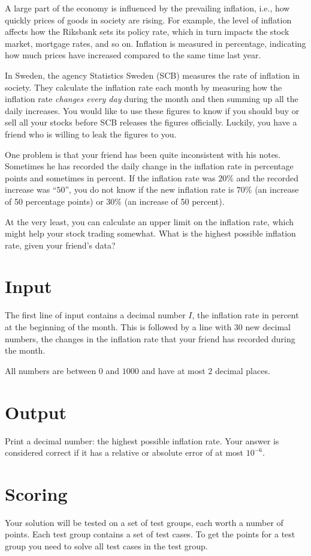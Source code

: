 A large part of the economy is influenced by the prevailing inflation, i.e., how quickly prices of
goods in society are rising. For example, the level of inflation affects how the Riksbank sets its
policy rate, which in turn impacts the stock market, mortgage rates, and so on.
Inflation is measured in percentage, indicating how much prices have increased compared to the same time last year.

In Sweden, the agency Statistics Sweden (SCB) measures the rate of inflation in society.
They calculate the inflation rate each month by measuring how the inflation rate \emph{changes every day}
during the month and then summing up all the daily increases.
You would like to use these figures to know if you should buy or sell all your stocks before SCB releases the figures officially.
Luckily, you have a friend who is willing to leak the figures to you.

One problem is that your friend has been quite inconsistent with his notes.
Sometimes he has recorded the daily change in the inflation rate in percentage points and sometimes in percent.
If the inflation rate was $20\%$ and the recorded increase was ``$50$'', you do not know if the new inflation
rate is $70\%$ (an increase of 50 percentage points) or $30\%$ (an increase of 50 percent).

At the very least, you can calculate an upper limit on the inflation rate, which might help your stock trading somewhat.
What is the highest possible inflation rate, given your friend's data?


\section*{Input}
The first line of input contains a decimal number $I$, the inflation rate in percent at the beginning of the month.
This is followed by a line with $30$ new decimal numbers, the changes in the inflation rate that your friend has
recorded during the month.

All numbers are between $0$ and $1000$ and have at most $2$ decimal places.

\section*{Output}
Print a decimal number: the highest possible inflation rate.
Your answer is considered correct if it has a relative or absolute error of at most $10^{-6}$.

\section*{Scoring}
Your solution will be tested on a set of test groups, each worth a number of points. Each test group contains
a set of test cases. To get the points for a test group you need to solve all test cases in the test group.

